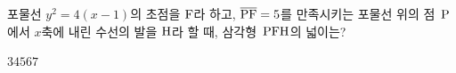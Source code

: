 포물선 $y^2=4(x-1)$의 초점을 $\mathrm{F}$라 하고, $\overline{\mathrm{PF}}=5$를 만족시키는 포물선 위의 점~$\mathrm{P}$에서 $x$축에 내린 수선의 발을 $\mathrm{H}$라 할 때, 삼각형~$\mathrm{PFH}$의 넓이는?
\begin{choices32}{$3$}{$4$}{$5$}{$6$}{$7$}\end{choices32}
